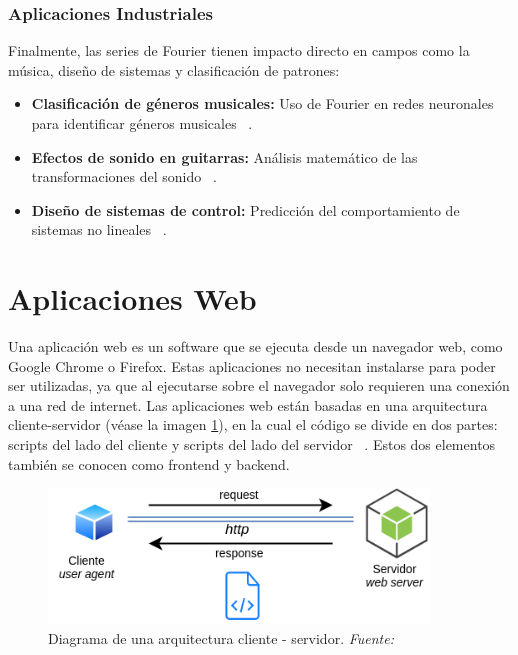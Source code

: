 \subsubsection{Aplicaciones Industriales}
Finalmente, las series de Fourier tienen impacto directo en campos como la música, diseño de sistemas y clasificación de patrones:
\begin{itemize}
	\item \textbf{Clasificación de géneros musicales:} Uso de Fourier en redes neuronales para identificar géneros musicales ~\cite{repositorioFourierARG}. 
	\item \textbf{Efectos de sonido en guitarras:} Análisis matemático de las transformaciones del sonido ~\cite{repositorioFourierARG}. 
	\item \textbf{Diseño de sistemas de control:} Predicción del comportamiento de sistemas no lineales ~\cite{repositorioFourierARG}. 
\end{itemize}



\section{Aplicaciones Web}
Una aplicación web es un software que se ejecuta desde un navegador web, como Google Chrome o Firefox. Estas aplicaciones no necesitan instalarse para poder ser utilizadas, ya que al ejecutarse sobre el navegador solo requieren una conexión a una red de internet. Las aplicaciones web están basadas en una arquitectura cliente-servidor (véase la imagen \ref{fig:cliente-servidor}), en la cual el código se divide en dos partes: scripts del lado del cliente y scripts del lado del servidor ~\cite{apliacionWebAmazon}. Estos dos elementos también se conocen como frontend y backend.

\begin{figure}[h]
	\centering	 
	\includegraphics[width=0.9\textwidth]{img/chapter03/ui-web-arquitectura.png}
	\caption[Diagrama de una arquitectura cliente - servidor]{Diagrama de una arquitectura cliente - servidor. \textit{Fuente: ~\cite{uqbar-wiki-web}}}
	\label{fig:cliente-servidor}  %
\end{figure}


